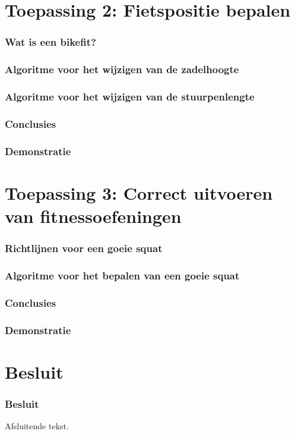 \documentclass
   [kulak] %
   {kulakbeamer}
\begin{document}
\section{Toepassing 2: Fietspositie bepalen}

\begin{frame}
	\frametitle{Wat is een bikefit?}
\end{frame}

\begin{frame}
	\frametitle{Algoritme voor het wijzigen van de zadelhoogte}
\end{frame}

\begin{frame}
	\frametitle{Algoritme voor het wijzigen van de stuurpenlengte}
\end{frame}

\begin{frame}
	\frametitle{Conclusies}
\end{frame}

\begin{frame}
	\frametitle{Demonstratie}
\end{frame}



\section{Toepassing 3: Correct uitvoeren van fitnessoefeningen}

\begin{frame}
	\frametitle{Richtlijnen voor een goeie squat}
\end{frame}

\begin{frame}
	\frametitle{Algoritme voor het bepalen van een goeie squat}
\end{frame}

\begin{frame}
	\frametitle{Conclusies}
\end{frame}

\begin{frame}
	\frametitle{Demonstratie}
\end{frame}



\section{Besluit}

\begin{frame}
\frametitle{Besluit}
Afsluitende tekst.
\end{frame}
\end{document}

